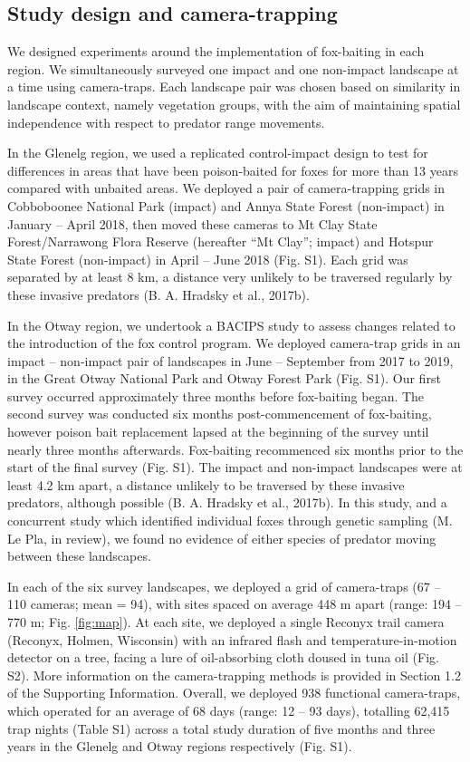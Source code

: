 \documentclass[]{elsarticle} %
\begin{document}
\hypertarget{study-design-and-camera-trapping}{%
\subsection{Study design and camera-trapping}\label{study-design-and-camera-trapping}}

We designed experiments around the implementation of fox-baiting in each region. We simultaneously surveyed one impact and one non-impact landscape at a time using camera-traps. Each landscape pair was chosen based on similarity in landscape context, namely vegetation groups, with the aim of maintaining spatial independence with respect to predator range movements.

In the Glenelg region, we used a replicated control-impact design to test for differences in areas that have been poison-baited for foxes for more than 13 years compared with unbaited areas. We deployed a pair of camera-trapping grids in Cobboboonee National Park (impact) and Annya State Forest (non-impact) in January -- April 2018, then moved these cameras to Mt Clay State Forest/Narrawong Flora Reserve (hereafter ``Mt Clay''; impact) and Hotspur State Forest (non-impact) in April -- June 2018 (Fig. S1). Each grid was separated by at least 8 km, a distance very unlikely to be traversed regularly by these invasive predators (B. A. Hradsky et al., 2017b).

In the Otway region, we undertook a BACIPS study to assess changes related to the introduction of the fox control program. We deployed camera-trap grids in an impact -- non-impact pair of landscapes in June -- September from 2017 to 2019, in the Great Otway National Park and Otway Forest Park (Fig. S1). Our first survey occurred approximately three months before fox-baiting began. The second survey was conducted six months post-commencement of fox-baiting, however poison bait replacement lapsed at the beginning of the survey until nearly three months afterwards. Fox-baiting recommenced six months prior to the start of the final survey (Fig. S1). The impact and non-impact landscapes were at least 4.2 km apart, a distance unlikely to be traversed by these invasive predators, although possible (B. A. Hradsky et al., 2017b). In this study, and a concurrent study which identified individual foxes through genetic sampling (M. Le Pla, in review), we found no evidence of either species of predator moving between these landscapes.

In each of the six survey landscapes, we deployed a grid of camera-traps (67 -- 110 cameras; mean = 94), with sites spaced on average 448 m apart (range: 194 -- 770 m; Fig. \ref{fig:map}). At each site, we deployed a single Reconyx trail camera (Reconyx, Holmen, Wisconsin) with an infrared flash and temperature-in-motion detector on a tree, facing a lure of oil-absorbing cloth doused in tuna oil (Fig. S2). More information on the camera-trapping methods is provided in Section 1.2 of the Supporting Information. Overall, we deployed 938 functional camera-traps, which operated for an average of 68 days (range: 12 -- 93 days), totalling 62,415 trap nights (Table S1) across a total study duration of five months and three years in the Glenelg and Otway regions respectively (Fig. S1).
\end{document}
